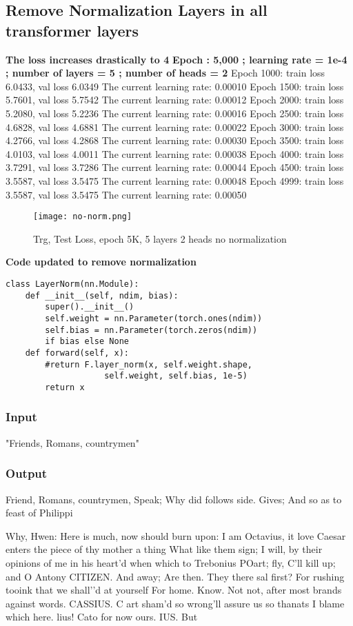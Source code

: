 \documentclass[conference]{IEEEtran}
\begin{document}
\subsection{Remove Normalization Layers in all transformer layers}
\textbf{The loss increases drastically to 4}
\textbf{Epoch : 5,000 ; learning rate = 1e-4 ; number of layers = 5 ; number of heads = 2}
Epoch 1000: train loss 6.0433, val loss 6.0349
The current learning rate: 0.00010
Epoch 1500: train loss 5.7601, val loss 5.7542
The current learning rate: 0.00012
Epoch 2000: train loss 5.2080, val loss 5.2236
The current learning rate: 0.00016
Epoch 2500: train loss 4.6828, val loss 4.6881
The current learning rate: 0.00022
Epoch 3000: train loss 4.2766, val loss 4.2868
The current learning rate: 0.00030
Epoch 3500: train loss 4.0103, val loss 4.0011
The current learning rate: 0.00038
Epoch 4000: train loss 3.7291, val loss 3.7286
The current learning rate: 0.00044
Epoch 4500: train loss 3.5587, val loss 3.5475
The current learning rate: 0.00048
Epoch 4999: train loss 3.5587, val loss 3.5475
The current learning rate: 0.00050
\begin{figure}[H]
    \centering
    \texttt{[image: no-norm.png]}
    \caption{Trg, Test Loss, epoch 5K, 5 layers 2 heads no normalization}
    \label{fig:epoch}
\end{figure}
\textbf{Code updated to remove normalization}
\begin{verbatim}
class LayerNorm(nn.Module):
    def __init__(self, ndim, bias):
        super().__init__()
        self.weight = nn.Parameter(torch.ones(ndim))
        self.bias = nn.Parameter(torch.zeros(ndim)) 
        if bias else None
    def forward(self, x):
        #return F.layer_norm(x, self.weight.shape, 
                    self.weight, self.bias, 1e-5)
        return x
\end{verbatim}

\subsubsection{Input}
"Friends, Romans, countrymen"
\subsubsection{Output}
Friend, Romans, countrymen,
Speak;
Why did follows side. Gives;
And so as to feast of Philippi

Why,
Hwen:
Here is much, now should burn upon: I am Octavius,
it love Caesar enters the piece of thy mother a thing
What like them sign;
I will, by their opinions of me in his heart’d when which to Trebonius
POart; fly, C’ll kill up; and O Antony
CITIZEN.
And away;
Are then.
They there sal first?
For rushing tooink that we shall’’d at yourself
For home.
Know.
Not not, after most brands against words.
CASSIUS.
C art sham’d so wrong’ll assure us so thanats
I blame which here.
lius! Cato for now ours.
IUS.
But
\end{document}
